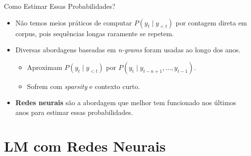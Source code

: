 \documentclass[aspectratio=169,xcolor=dvipsnames]{beamer}
\begin{document}
\begin{frame}{Como Estimar Essas Probabilidades?}
\begin{itemize}
    \item Não temos meios práticos de computar $P(y_t \mid y_{<t})$ por contagem direta em corpus, pois sequências longas raramente se repetem.
    \item Diversas abordagens baseadas em \textit{n-grams} foram usadas ao longo dos anos.
    \begin{itemize}
        \item Aproximam $P(y_t \mid y_{<t})$ por $P(y_t \mid y_{t-n+1}, \dots, y_{t-1})$.
        \item Sofrem com \textit{sparsity} e contexto curto.
    \end{itemize}
    \item \textbf{Redes neurais} são a abordagem que melhor tem funcionado nos últimos anos para estimar essas probabilidades.
\end{itemize}
\end{frame}

\section{LM com Redes Neurais}
\end{document}
